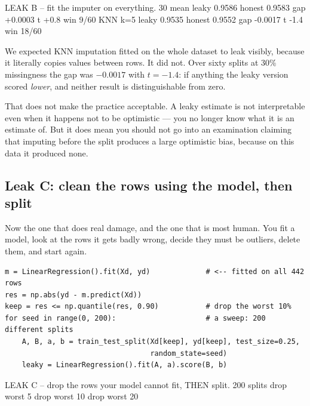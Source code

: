 \documentclass[11pt]{article}
\begin{document}
\begin{codeout}
LEAK B -- fit the imputer on everything.  30%
  mean          leaky 0.9586  honest 0.9583  gap +0.0003  t  +0.8  win 9/60
  KNN k=5       leaky 0.9535  honest 0.9552  gap -0.0017  t  -1.4  win 18/60
\end{codeout}

\begin{caution}
We expected KNN imputation fitted on the whole dataset to leak visibly, because
it literally copies values between rows. It did not. Over sixty splits at
$30\%$ missingness the gap was $-0.0017$ with $t = -1.4$: if anything the leaky
version scored \emph{lower}, and neither result is distinguishable from zero.

That does not make the practice acceptable. A leaky estimate is not
interpretable even when it happens not to be optimistic --- you no longer know
what it is an estimate of. But it does mean you should not go into an
examination claiming that imputing before the split produces a large
optimistic bias, because on this data it produced none.
\end{caution}

\subsection{Leak C: clean the rows using the model, then split}

Now the one that does real damage, and the one that is most human. You fit a
model, look at the rows it gets badly wrong, decide they must be outliers,
delete them, and start again.

\begin{lstlisting}
m = LinearRegression().fit(Xd, yd)             # <-- fitted on all 442 rows
res = np.abs(yd - m.predict(Xd))
keep = res <= np.quantile(res, 0.90)           # drop the worst 10%
for seed in range(0, 200):                     # a sweep: 200 different splits
    A, B, a, b = train_test_split(Xd[keep], yd[keep], test_size=0.25,
                                  random_state=seed)
    leaky = LinearRegression().fit(A, a).score(B, b)
\end{lstlisting}
\begin{codeout}
LEAK C -- drop the rows your model cannot fit, THEN split.  200 splits
  drop worst 5%
  drop worst 10%
  drop worst 20%
\end{codeout}
\end{document}
